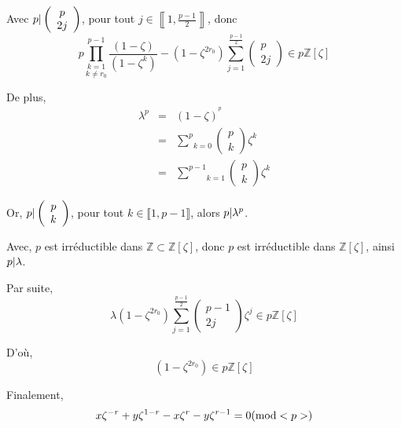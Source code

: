 Avec $p |  \left( \begin{array}{c}
  p\\
  2 j
\end{array} \right)$, pour tout $j \in \left\llbracket 1, \frac{p - 1}{2}
\right\rrbracket$, donc
\[ p  \underset{k \neq r_0}{\underset{k = 1}{\overset{p - 1}{\prod}}} \frac{(1
   - \zeta)}{(1 - \zeta^k)} - (1 - \zeta^{2 r_0}) \underset{j =
   1}{\overset{\frac{p - 1}{2}}{\sum}} \left( \begin{array}{c}
     p\\
     2 j
   \end{array} \right) \in p\mathbb{Z} [\zeta] \]


De plus,
\begin{eqnarray*}
  \lambda^p & = & (1 - \zeta)^{^p}\\
  & = & \underset{k = 0}{\overset{p}{\sum}} \left( \begin{array}{c}
    p\\
    k
  \end{array} \right) \zeta^k\\
  & = & \underset{k = 1}{\overset{p - 1}{\sum}} \left( \begin{array}{c}
    p\\
    k
  \end{array} \right) \zeta^k
\end{eqnarray*}


Or, $p |  \left( \begin{array}{c}
  p\\
  k
\end{array} \right)$, pour tout $k \in \llbracket 1, p - 1 \rrbracket$, alors
$p | \lambda^p $.

Avec, $p$ est irr{\'e}ductible dans $\mathbb{Z} \subset \mathbb{Z} [\zeta]$,
donc $p$ est irr{\'e}ductible dans $\mathbb{Z} [\zeta]$, ainsi $p | \lambda
$.

Par suite,
\[ \lambda (1 - \zeta^{2 r_0}) \underset{j = 1}{\overset{\frac{p -
   1}{2}}{\sum}} \left( \begin{array}{c}
     p - 1\\
     2 j
   \end{array} \right) \zeta^j \in p\mathbb{Z} [\zeta] \]


D'o{\`u},
\[ (1 - \zeta^{2 r_0}) \in p\mathbb{Z} [\zeta] \]


Finalement,
\[ x \zeta^{- r} + y \zeta^{1 - r} - x \zeta^r - y \zeta^{r - 1} = 0
   (\operatorname{mod} < p >) \]


